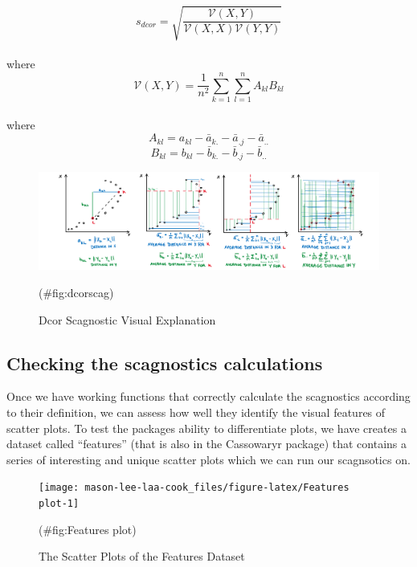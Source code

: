 \[s_{dcor}= \sqrt{\frac{\mathcal{V}(X,Y)}{\mathcal{V}(X,X)\mathcal{V}(Y,Y)}}\]\\
where \[\mathcal{V}
(X,Y)=\frac{1}{n^2}\sum_{k=1}^n\sum_{l=1}^nA_{kl}B_{kl}\]\\
where \[A_{kl}=a_{kl}-\bar{a}_{k.}-\bar{a}_{.j}-\bar{a}_{..}\]
\[B_{kl}=b_{kl}-\bar{b}_{k.}-\bar{b}_{.j}-\bar{b}_{..}\]

\begin{Schunk}
\begin{figure}
\includegraphics[width=1\linewidth,height=0.2\textheight]{figures/drawdcor} \caption[Dcor Scagnostic Visual Explanation]{Dcor Scagnostic Visual Explanation}(\#fig:dcorscag)
\end{figure}
\end{Schunk}

\hypertarget{checking-the-scagnostics-calculations}{%
\subsection{Checking the scagnostics
calculations}\label{checking-the-scagnostics-calculations}}

Once we have working functions that correctly calculate the scagnostics
according to their definition, we can assess how well they identify the
visual features of scatter plots. To test the packages ability to
differentiate plots, we have creates a dataset called ``features'' (that
is also in the Cassowaryr package) that contains a series of interesting
and unique scatter plots which we can run our scagnsotics on.

\begin{Schunk}
\begin{figure}
\texttt{[image: mason-lee-laa-cook\_files/figure-latex/Features plot-1]} \caption[The Scatter Plots of the Features Dataset]{The Scatter Plots of the Features Dataset}(\#fig:Features plot)
\end{figure}
\end{Schunk}

